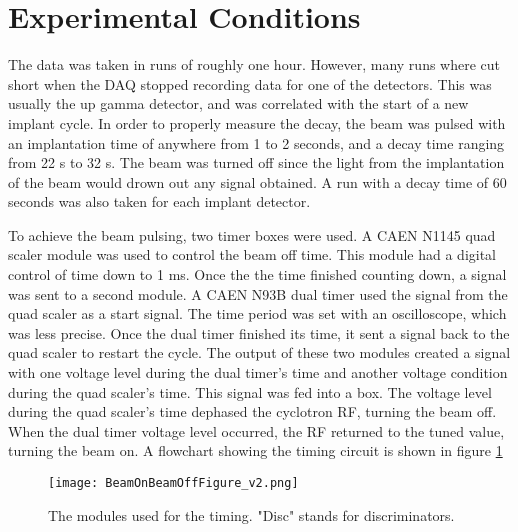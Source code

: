 \documentclass[../MaxHughesThesis.tex]{subfiles}
\begin{document}
\section{Experimental Conditions}
The data was taken in runs of roughly one hour. 
However, many runs where cut short when the DAQ stopped recording data for one of the detectors.
This was usually the up gamma detector, and was correlated with the start of a new implant cycle.
In order to properly measure the decay, the beam was pulsed with an implantation time of anywhere from 1 to 2 seconds, and a decay time ranging from 22 s to 32 s. 
The beam was turned off since the light from the implantation of the beam would drown out any signal obtained. 
A run with a decay time of 60 seconds was also taken for each implant detector. 

To achieve the beam pulsing, two timer boxes were used.
A CAEN N1145 quad scaler module was used to control the beam off time.
This module had a digital control of time down to 1 ms.
Once the the time finished counting down, a signal was sent to a second module. 
A CAEN N93B dual timer used the signal from the quad scaler as a start signal.
The time period was set with an oscilloscope, which was less precise. 
Once the dual timer finished its time, it sent a signal back to the quad scaler to restart the cycle.
The output of these two modules created a signal with one voltage level during the dual timer's time and another voltage condition during the quad scaler's time.
This signal was fed into a box.
The voltage level during the quad scaler's time dephased the cyclotron RF, turning the beam off.
When the dual timer voltage level occurred, the RF returned to the tuned value, turning the beam on.  
A flowchart showing the timing circuit is shown in figure \ref{fig:TimingFig} 
\begin{figure}
	\centerline{\texttt{[image: BeamOnBeamOffFigure\_v2.png]}}
	\caption{The modules used for the timing.
		 "Disc" stands for discriminators.
		 }
	\label{fig:TimingFig}
\end{figure}
\end{document}
